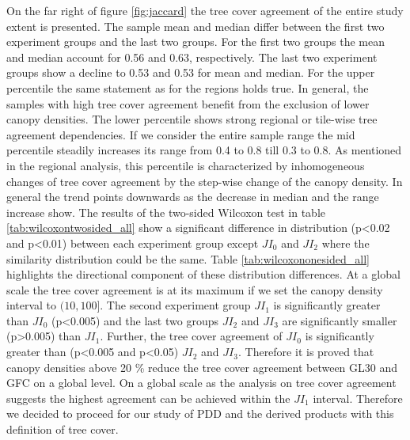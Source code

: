 			On the far right of figure \ref{fig:jaccard} the tree cover agreement of the entire study extent is presented. The sample mean and median differ between the first two experiment groups and the last two groups. For the first two groups the mean and median account for 0.56 and 0.63, respectively. The last two experiment groups show a decline to 0.53 and 0.53 for mean and median. For the upper percentile the same statement as for the regions holds true. In general, the samples with high tree cover agreement benefit from the exclusion of lower canopy densities. The lower percentile shows strong regional or tile-wise tree agreement dependencies. If we consider the entire sample range the mid percentile steadily increases its range from 0.4 to 0.8 till 0.3 to 0.8. As mentioned in the regional analysis, this percentile is characterized by inhomogeneous changes of tree cover agreement by the step-wise change of the canopy density. In general the trend points downwards as the decrease in median and the range increase show. The results of the two-sided Wilcoxon test in table \ref{tab:wilcoxontwosided_all} show a significant difference in distribution (p<0.02 and p<0.01) between each experiment group except $JI_0$ and $JI_2$ where the similarity distribution could be the same. Table \ref{tab:wilcoxononesided_all} highlights the directional component of these distribution differences. At a global scale the tree cover agreement is at its maximum if we set the canopy density interval to $(10,100]$. The second experiment group $JI_1$ is significantly greater than $JI_0$ (p<0.005) and the last two groups $JI_2$ and $JI_3$ are significantly smaller (p>0.005) than $JI_1$. Further, the tree cover agreement of $JI_0$ is significantly greater than (p<0.005 and p<0.05) $JI_2$ and $JI_3$. Therefore it is proved that canopy densities above 20 \% reduce the tree cover agreement between \ac{GL30} and \ac{GFC} on a global level. On a global scale as the analysis on tree cover agreement suggests the highest agreement can be achieved within the $JI_1$ interval. Therefore we decided to proceed for our study of \ac{PDD} and the derived products with this definition of tree cover. 

